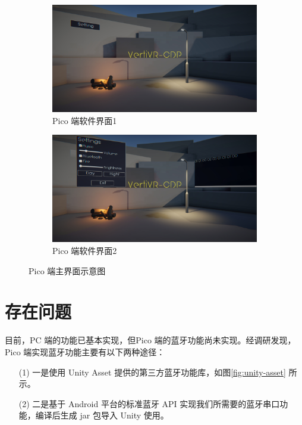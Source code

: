 \documentclass[a4paper,10pt]{article}
\begin{document}
		\begin{figure}[htbp] 
			\centering 
			\begin{subfigure}{0.49\textwidth}
				\includegraphics[width=\linewidth]{picture/Pico UI 1}
				\captionsetup{font=scriptsize}
				\caption{Pico 端软件界面1}
				\label{fig:pico-ui-1}
			\end{subfigure}
			\begin{subfigure}{0.49\textwidth}
				\includegraphics[width=\linewidth]{picture/Pico UI 2}
				\captionsetup{font=scriptsize}
				\caption{Pico 端软件界面2}
				\label{fig:pico-ui-2}
			\end{subfigure}
			\caption{
				\label{fig: Pico Main menu}	
				Pico 端主界面示意图				
			}
		\end{figure}
	
		\section{存在问题}
		
		目前，PC 端的功能已基本实现，但Pico 端的蓝牙功能尚未实现。经调研发现，Pico 端实现蓝牙功能主要有以下两种途径：
		
		\begin{itemize}
			\item[(1)] 一是使用 Unity Asset 提供的第三方蓝牙功能库，如图\ref{fig:unity-asset} 所示。
			\item[(2)] 二是基于 Android 平台的标准蓝牙 API 实现我们所需要的蓝牙串口功能，编译后生成 jar 包导入 Unity 使用。
		\end{itemize}
\end{document}
